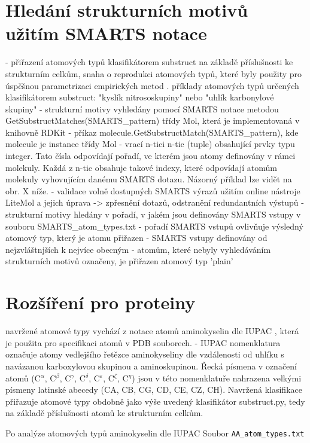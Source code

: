 \section{Hledání strukturních motivů užitím SMARTS notace}
\label{substruct}
- přiřazení atomových typů klasifikátorem substruct na základě příslušnosti ke strukturním celkům, snaha o reprodukci atomových typů, které byly použity pro úspěšnou parametrizaci empirických metod \cite{attyp1, attyp2}. 
příklady atomových typů určených klasifikátorem substruct: "kyslík nitrososkupiny" nebo "uhlík karbonylové skupiny" 
- strukturní motivy vyhledány pomocí SMARTS notace metodou GetSubstructMatches(SMARTS\_pattern) třídy Mol, která je implementovaná v knihovně RDKit
- příkaz molecule.GetSubstructMatch(SMARTS\_pattern), kde molecule je instance třídy Mol
- vrací n-tici n-tic (tuple) obsahující prvky typu integer. Tato čísla odpovídají pořadí, ve kterém jsou atomy definovány v rámci molekuly. Každá z n-tic obsahuje takové indexy, které odpovídají atomům molekuly vyhovujícím danému SMARTS dotazu. Názorný příklad lze vidět na obr. X níže.
- validace volně dostupných SMARTS výrazů užitím online nástroje LiteMol a jejich úprava -> zpřesnění dotazů, odstranění redundantních výstupů 
- strukturní motivy hledány v pořadí, v jakém jsou definovány SMARTS vstupy v souboru SMARTS\_atom\_types.txt - pořadí SMARTS vstupů ovlivňuje výsledný atomový typ, který je atomu přiřazen
- SMARTS vstupy definovány od nejzvláštnjších k nejvíce obecným 
- atomům, které nebyly vyhledáváním strukturních motivů označeny, je přiřazen atomový typ 'plain'



\section{Rozšíření pro proteiny}
navržené atomové typy vychází z notace atomů aminokyselin dle IUPAC \cite{AA_nomenclature}, která je použita pro specifikaci atomů v PDB souborech. 
- IUPAC nomenklatura označuje atomy vedlejšího řetězce aminokyseliny dle vzdálenosti od uhlíku s navázanou karboxylovou skupinou a aminoskupinou. Řecká písmena v označení atomů (C$^\alpha$, C$^\beta$, C$^\gamma$, C$^\delta$, C$^\varepsilon$, C$^\zeta$, C$^\eta$) jsou v této nomenklatuře nahrazena velkými písmeny latinské abecedy (CA, CB, CG, CD, CE, CZ, CH). Navržená klasifikace přiřazuje atomové typy obdobně jako výše uvedený klasifikátor substruct.py, tedy na základě příslušnosti atomů ke strukturním celkům.

Po analýze atomových typů aminokyselin dle IUPAC Soubor \verb|AA_atom_types.txt| 



